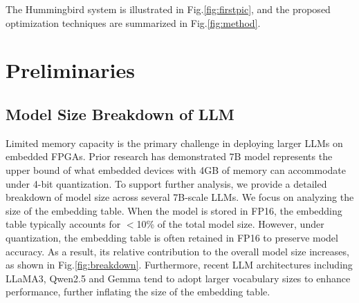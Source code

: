 \documentclass[conference]{IEEEtran}
\begin{document}
The Hummingbird system is illustrated in Fig.\ref{fig:firstpic}, and the proposed optimization techniques are summarized in Fig.\ref{fig:method}.

\section{Preliminaries}


\subsection{Model Size Breakdown of LLM}

Limited memory capacity is the primary challenge in deploying larger LLMs on embedded FPGAs. Prior research \cite{li2025pushing} has demonstrated 7B model represents the upper bound of what embedded devices with 4GB of memory can accommodate under 4-bit quantization. To support further analysis, we provide a detailed breakdown of model size across several 7B-scale LLMs\cite{touvron2023llama2openfoundation}\cite{grattafiori2024llama3herdmodels}\cite{yang2024qwen2}\cite{team2024gemma}.
We focus on analyzing the size of the embedding table.
When the model is stored in FP16, the embedding table typically accounts for $<$10\% of the total model size. However, under quantization, the embedding table is often retained in FP16 to preserve model accuracy. As a result, its relative contribution to the overall model size increases, as shown in Fig.\ref{fig:breakdown}. Furthermore, recent LLM architectures including LLaMA3\cite{grattafiori2024llama3herdmodels}, Qwen2.5\cite{yang2024qwen2} and Gemma\cite{team2024gemma} tend to adopt larger vocabulary sizes to enhance performance, further inflating the size of the embedding table.
\end{document}
